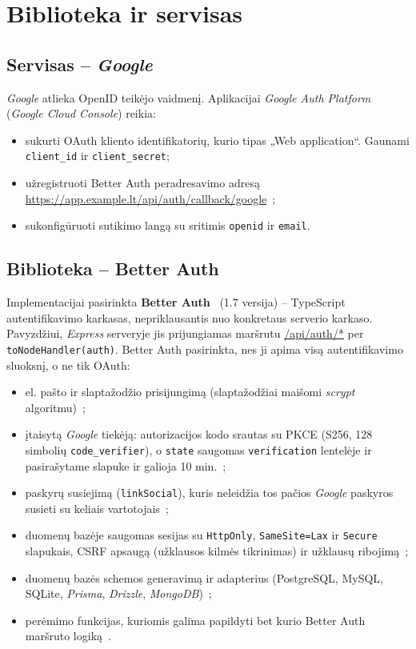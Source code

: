 \section{Biblioteka ir servisas}
\label{sec:biblioteka}

\subsection{Servisas -- \texorpdfstring{\textit{Google}}{Google}}
\label{subsec:google}

\textit{Google} atlieka OpenID teikėjo vaidmenį. Aplikacijai \textit{Google Auth Platform} (\textit{Google Cloud Console}) reikia:
\begin{itemize}
    \item sukurti OAuth kliento identifikatorių, kurio tipas „Web application“. Gaunami \texttt{client\_id} ir \texttt{client\_secret};
    \item užregistruoti Better Auth peradresavimo adresą \url{https://app.example.lt/api/auth/callback/google}~\cite{better_auth_google};
    \item sukonfigūruoti sutikimo langą su sritimis \texttt{openid} ir \texttt{email}.
\end{itemize}

\subsection{Biblioteka -- Better Auth}
\label{subsec:better_auth}

Implementacijai pasirinkta \textbf{Better Auth}~\cite{better_auth} (1.7 versija) -- TypeScript autentifikavimo karkasas, nepriklausantis nuo konkretaus serverio karkaso. Pavyzdžiui, \textit{Express} serveryje jis prijungiamas maršrutu \url{/api/auth/*} per \texttt{toNodeHandler(auth)}. Better Auth pasirinkta, nes ji apima visą autentifikavimo sluoksnį, o ne tik OAuth:
\begin{itemize}
    \item el. pašto ir slaptažodžio prisijungimą (slaptažodžiai maišomi \textit{scrypt} algoritmu)~\cite{better_auth_security};
    \item įtaisytą \textit{Google} tiekėją: autorizacijos kodo srautas su PKCE (S256, 128 simbolių \texttt{code\_verifier}), o \texttt{state} saugomas \texttt{verification} lentelėje ir pasirašytame slapuke ir galioja 10 min.~\cite{better_auth_oauth,better_auth_security};
    \item paskyrų susiejimą (\texttt{linkSocial}), kuris neleidžia tos pačios \textit{Google} paskyros susieti su keliais vartotojais~\cite{better_auth_accounts};
    \item duomenų bazėje saugomas sesijas su \texttt{HttpOnly}, \texttt{SameSite=Lax} ir \texttt{Secure} slapukais, CSRF apsaugą (užklausos kilmės tikrinimas) ir užklausų ribojimą~\cite{better_auth_security};
    \item duomenų bazės schemos generavimą ir adapterius (PostgreSQL, MySQL, SQLite, \textit{Prisma}, \textit{Drizzle}, \textit{MongoDB})~\cite{better_auth_database};
    \item perėmimo funkcijas, kuriomis galima papildyti bet kurio Better Auth maršruto logiką~\cite{better_auth_hooks}.
\end{itemize}

